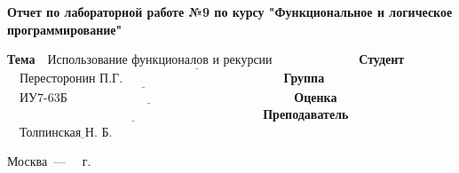 \begin{titlepage}
    \begin{center}
        \Large\textbf{Отчет по лабораторной работе №9 по курсу "Функциональное и логическое программирование"}
    \end{center}

    \noindent\textbf{Тема} $\underline{\text{~~Использование функционалов и рекурсии~~~~~~~~~~~~~~~~~~~~}}$\newline\newline\newline
    \noindent\textbf{Студент} $\underline{\text{~~~Пересторонин П.Г.~~~~~~~~~~~~~~~~~~~~~~~~~~~~~~~~~~~~~~}}$\newline\newline
    \noindent\textbf{Группа} $\underline{\text{~~~ИУ7-63Б~~~~~~~~~~~~~~~~~~~~~~~~~~~~~~~~~~~~~~~~~~~~~~~~~~~~~~}}$\newline\newline
    \noindent\textbf{Оценка} $\underline{\text{~~~~~~~~~~~~~~~~~~~~~~~~~~~~~~~~~~~~~~~~~~~~~~~~~~~~~~~~~~~~~}}$\newline\newline
    \noindent\textbf{Преподаватель} $\underline{\text{~~~Толпинская Н. Б.~~~~~~~~~~~}}$\newline

    \begin{center}
        \vfill
        Москва~---~\the\year
        ~г.
    \end{center}
    \restoregeometry
\end{titlepage}
